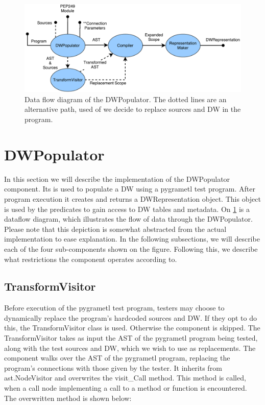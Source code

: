 \begin{figure}
\centering
\includegraphics[width=\textwidth]{figures/reinterpreter.pdf}
\caption{Data flow diagram of the DWPopulator. The dotted lines are an alternative path, used of we decide to replace sources and DW in the program.}
\label{fig:reinterpreter}
\end{figure}
\section{DWPopulator}\label{sec:dwpopulator}

In this section we will describe the implementation of the DWPopulator component. Its is used to populate a DW using a pygrametl test program. After program execution it creates and returns a DWRepresentation object. This object is used by the predicates to gain access to DW tables and metadata. On \cref{fig:reinterpreter} is a dataflow diagram, which illustrates the flow of data through the DWPopulator. Please note that this depiction is somewhat abstracted from the actual implementation to ease explanation. In the following subsections, we will describe each of the four sub-components shown on the figure. Following this, we describe what restrictions the component operates according to.

\subsection{TransformVisitor}
Before execution of the pygrametl test program, testers may choose to dynamically replace the program's hardcoded sources and DW. If they opt to do this, the TransformVisitor class is used. Otherwise the component is skipped.
The TransformVisitor takes as input the AST of the pygrametl program being tested, along with the test sources and DW, which we wish to use as replacements. The component walks over the AST of the pygrametl program, replacing the program's connections with those given by the tester. It inherits from ast.NodeVisitor and overwrites the visit\_Call method. This method is called, when a call node implementing a call to a method or function is encountered. The overwritten method is shown below:

